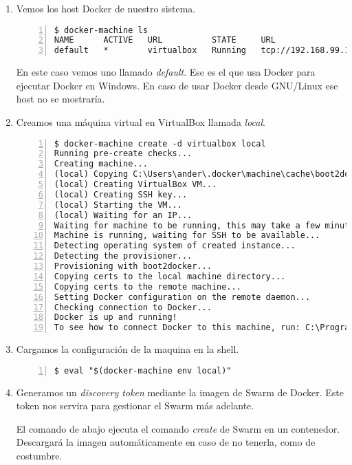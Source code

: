 			\begin{enumerate}
				\item Vemos los host Docker de nuestro sistema.
				\begin{lstlisting}[style=consola,numbers=left]
$ docker-machine ls
NAME      ACTIVE   URL          STATE     URL                         SWARM   DOCKER   ERRORS
default   *        virtualbox   Running   tcp://192.168.99.100:2376           v1.9.1
				\end{lstlisting}
				En este caso vemos uno llamado \textit{default}. Ese es el que usa Docker para ejecutar Docker en Windows. En caso de usar Docker desde GNU/Linux ese host no se mostraría.
			
				\item Creamos una máquina virtual en VirtualBox llamada \textit{local}.
				\begin{lstlisting}[style=consola,numbers=left]
$ docker-machine create -d virtualbox local
Running pre-create checks...
Creating machine...
(local) Copying C:\Users\ander\.docker\machine\cache\boot2docker.iso to C:\Users\ander\.docker\machine\machines\local\boot2docker.iso...
(local) Creating VirtualBox VM...
(local) Creating SSH key...
(local) Starting the VM...
(local) Waiting for an IP...
Waiting for machine to be running, this may take a few minutes...
Machine is running, waiting for SSH to be available...
Detecting operating system of created instance...
Detecting the provisioner...
Provisioning with boot2docker...
Copying certs to the local machine directory...
Copying certs to the remote machine...
Setting Docker configuration on the remote daemon...
Checking connection to Docker...
Docker is up and running!
To see how to connect Docker to this machine, run: C:\Program Files\Docker Toolbox\docker-machine.exe env local
				\end{lstlisting}

				\item Cargamos la configuración de la maquina en la shell.
				\begin{lstlisting}[style=consola,numbers=left]
$ eval "$(docker-machine env local)"
				\end{lstlisting}
			
				\item Generamos un \textit{discovery token} mediante la imagen de Swarm de Docker. Este token nos servira para gestionar el Swarm más adelante.
			
				El comando de abajo ejecuta el comando \textit{create} de Swarm en un contenedor. Descargará la imagen automáticamente en caso de no tenerla, como de costumbre.
				

\end{enumerate}
